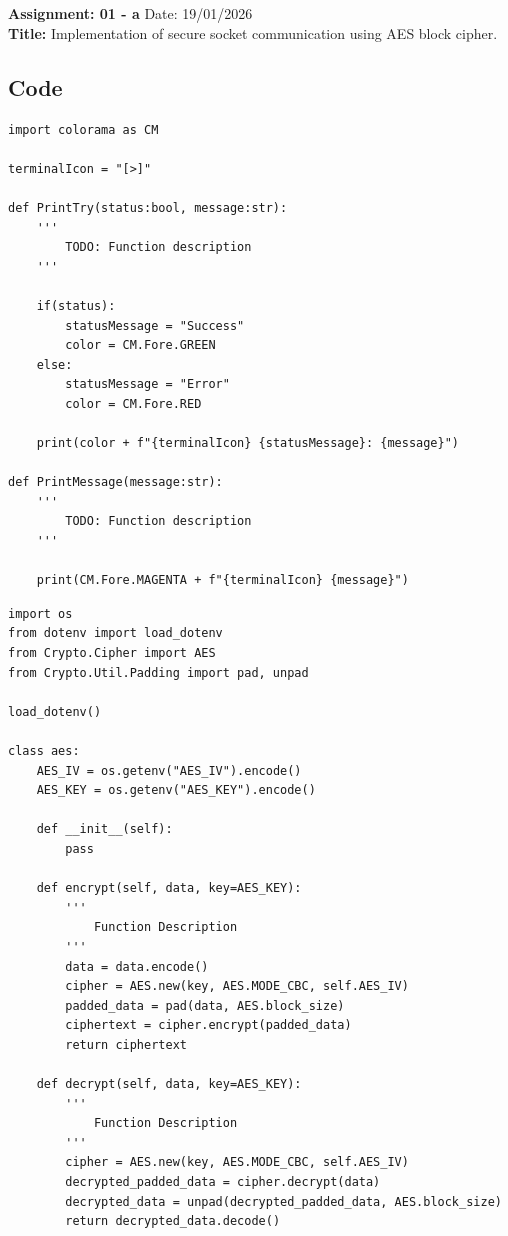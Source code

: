 \section{}
\noindent \textbf{Assignment: 01 - a}
\hfill Date: 19/01/2026 \\
\noindent
\textbf{Title:} Implementation of secure socket communication using AES block cipher.

\subsection*{Code}
\begin{lstlisting}[style=mypython, caption={TerminalMessage.py}, label={code:A-1-a-TerminalMessage}]
import colorama as CM

terminalIcon = "[>]"

def PrintTry(status:bool, message:str):
    '''
        TODO: Function description
    '''

    if(status):
        statusMessage = "Success"
        color = CM.Fore.GREEN
    else:
        statusMessage = "Error"
        color = CM.Fore.RED

    print(color + f"{terminalIcon} {statusMessage}: {message}")

def PrintMessage(message:str):
    '''
        TODO: Function description
    '''

    print(CM.Fore.MAGENTA + f"{terminalIcon} {message}")
\end{lstlisting}

\begin{lstlisting}[style=mypython, caption={Encryption.py}, label={code:A-1-a-Encryption}]
import os
from dotenv import load_dotenv
from Crypto.Cipher import AES
from Crypto.Util.Padding import pad, unpad

load_dotenv()

class aes:
    AES_IV = os.getenv("AES_IV").encode()
    AES_KEY = os.getenv("AES_KEY").encode()

    def __init__(self):
        pass

    def encrypt(self, data, key=AES_KEY):
        '''
            Function Description
        '''
        data = data.encode()
        cipher = AES.new(key, AES.MODE_CBC, self.AES_IV)
        padded_data = pad(data, AES.block_size)
        ciphertext = cipher.encrypt(padded_data)
        return ciphertext
    
    def decrypt(self, data, key=AES_KEY):
        '''
            Function Description
        '''
        cipher = AES.new(key, AES.MODE_CBC, self.AES_IV)
        decrypted_padded_data = cipher.decrypt(data)
        decrypted_data = unpad(decrypted_padded_data, AES.block_size)
        return decrypted_data.decode()
\end{lstlisting}

